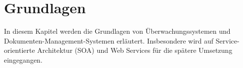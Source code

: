 \section{Grundlagen}
In diesem Kapitel werden die Grundlagen von Überwachungssystemen und Dokumenten-Management-Systemen erläutert.
Insbesondere wird auf Service-orientierte Architektur (\gls{SOA}) und Web Services für die spätere Umsetzung eingegangen.














